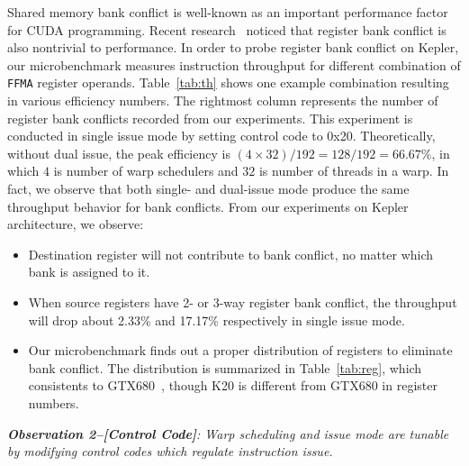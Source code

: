 Shared memory bank conflict is well-known as an important performance factor for CUDA programming.
Recent research~\cite{lai} noticed that register bank conflict is also nontrivial to performance.
In order to probe
register bank conflict on Kepler, our microbenchmark measures instruction throughput for different combination of {\tt FFMA}
register operands.
Table~\ref{tab:th} shows one example combination resulting in various efficiency numbers.
The rightmost column represents the number of register bank conflicts recorded from our experiments.
This experiment is conducted in single issue mode by setting control code to 0x20.
Theoretically, without dual issue, the peak efficiency is $(4\times32)/192=128/192=66.67\%$, in which $4$ is number of warp schedulers and $32$
is number of threads in a warp.
In fact, we observe that both single- and dual-issue mode produce the same throughput behavior for bank conflicts.
From our experiments on Kepler architecture, we observe:
\begin{itemize}
\item Destination register will not contribute to bank conflict, no matter which bank is assigned to it.
\item When source registers have 2- or 3-way register bank conflict, the throughput will drop about 2.33\% and 17.17\% respectively in single issue mode.
\item Our microbenchmark finds out a proper distribution of registers to eliminate bank conflict.
     The distribution is summarized in Table~\ref{tab:reg}, which consistents to GTX680~\cite{lai}, though K20 is
        different from GTX680 in register numbers. 

\end{itemize}


{\em {\bf Observation 2--[Control Code]}:
Warp scheduling and issue mode are tunable by modifying control codes which regulate instruction issue.}

